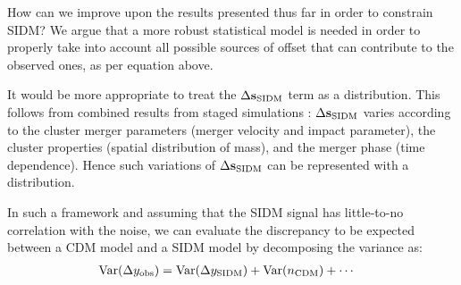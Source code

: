 \documentclass[usenatbib]{mn2e}
\newcommand{\offset}{\Delta {\bf s}}
\newcommand{\SIDM}{{\rm SIDM}}
\newcommand{\Var}{\mathrm{Var}}
\begin{document}
{How can we improve upon the results presented thus far in order to constrain SIDM? We argue that a more robust statistical model is needed in order to properly take into account all possible sources of offset that can contribute to the observed ones, as per equation above.

It would be more appropriate to treat the $\offset_\SIDM$ term as a distribution. This follows from combined results from staged simulations \citep{Kahlhoefer14, Kim:2016}: $\offset_\SIDM$ varies according to the cluster merger parameters (merger
velocity and impact parameter), the cluster properties (spatial distribution of mass), and the merger phase (time dependence). Hence such variations of $\offset_\SIDM$ can be represented with a distribution. 




In such a framework and assuming that the SIDM signal has little-to-no correlation with the noise, we can evaluate the discrepancy to be expected between a CDM model 
and a SIDM model by decomposing the variance as:
\begin{align}
	\Var(\Delta y_{\rm obs}) &= \Var(\Delta y_\SIDM) + \Var(n_{\rm CDM}) + \cdots
\end{align}

}
\end{document}
